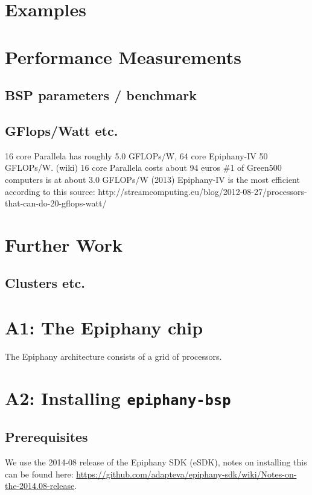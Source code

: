 \documentclass{article}
\renewcommand{\(}{\left(}
\renewcommand{\)}{\right)}
\begin{document}
\section{Examples}

\section{Performance Measurements}

\subsection{BSP parameters / benchmark}

\subsection{GFlops/Watt etc.}
16 core Parallela has roughly 5.0 GFLOPs/W, 64 core Epiphany-IV 50 GFLOPs/W. (wiki)
16 core Parallela costs about 94 euros
\#1 of Green500 computers is at about 3.0 GFLOPs/W (2013)
Epiphany-IV is the most efficient according to this source:
http://streamcomputing.eu/blog/2012-08-27/processors-that-can-do-20-gflops-watt/

\section{Further Work}

\subsection{Clusters etc.}

\section{A1: The Epiphany chip}

The Epiphany architecture consists of a grid of processors.

\section{A2: Installing \texttt{epiphany-bsp}}

\subsection{Prerequisites}

We use the 2014-08 release of the Epiphany SDK (eSDK), notes on installing this can be found here: \url{https://github.com/adapteva/epiphany-sdk/wiki/Notes-on-the-2014.08-release}.
\end{document}
